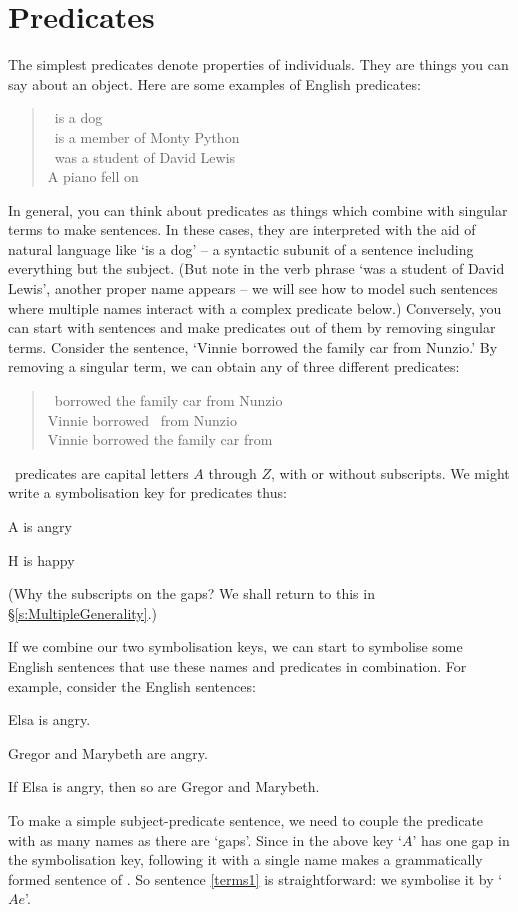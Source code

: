 \section{Predicates}
The simplest predicates denote properties of individuals. They are things you can say about an object. Here are some examples of English predicates:
	\begin{quote}
		\blank\ is a dog\\
		\blank\ is a member of Monty Python\\
		\blank\ was a student of David Lewis\\ 
		A piano fell on \blank
	\end{quote}
In general, you can think about predicates as things which combine with singular terms to make sentences. In these cases, they are interpreted with the aid of natural language  like `is a dog' – a syntactic subunit of a sentence including everything but the subject. (But note in the verb phrase `was a student of David Lewis', another proper name appears – we will see how to model such sentences where multiple names interact with a complex predicate below.) Conversely, you can start with sentences and make predicates out of them by removing singular terms. Consider the sentence, `Vinnie borrowed the family car from Nunzio.' By removing a singular term, we can obtain any of three different predicates:
	\begin{quote}
		\blank\ borrowed the family car from Nunzio\\
		Vinnie borrowed \blank\ from Nunzio\\
		Vinnie borrowed the family car from \blank
	\end{quote}
\FOL\ predicates are capital letters $A$ through $Z$, with or without subscripts. We might write a symbolisation key for predicates thus:
	\begin{ekey}
		\item[A]  is angry
		\item[H]  is happy
	\end{ekey}
(Why the subscripts on the gaps? We shall return to this in §\ref{s:MultipleGenerality}.)

If we combine our two symbolisation keys, we can start to symbolise some English sentences that use these names and predicates in combination. For example, consider the English sentences:
	\begin{earg}
		\item[\ex{terms1}] Elsa is angry.
		\item[\ex{terms2a}] Gregor and Marybeth are angry.
		\item[\ex{terms2}] If Elsa is angry, then so are Gregor and Marybeth.
	\end{earg}
To make a simple subject-predicate sentence, we need to couple the predicate with as many names as there are `gaps'. Since in the above key `$A$' has one gap in the symbolisation key, following it with a single name makes a grammatically formed sentence of \FOL. So sentence \ref{terms1} is straightforward: we symbolise it by `$Ae$'.

